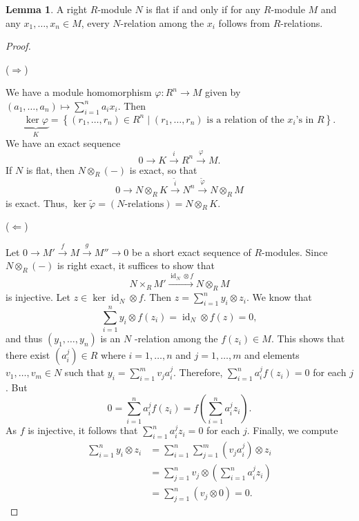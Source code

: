 \documentclass[10pt,letterpaper,cm]{nupset}
\theoremstyle{definition}
\theoremstyle{theorem}
\newtheorem{lemma}[definition]{Lemma}
\theoremstyle{remark}
\newcommand{\1}{\mathbf{1}}
\newcommand{\0}{\vec 0}
\DeclareMathOperator{\id}{id}
\begin{document}
\begin{lemma}
A right $R$-module $N$ is flat if and only if for any $R$-module $M$ and any $x_1, \ldots, x_n \in M$, every $N$-relation among the $x_i$ follows from $R$-relations. 
\end{lemma}
\begin{proof} $ $

($\Longrightarrow$) 

We have a module homomorphism $\varphi : R^n \to M$ given by $(a_1, \ldots, a_n)\mapsto \sum_{i=1}^na_ix_i$. Then $$\underbrace{\ker{\varphi}}_{K}= \left\{(r_1, \ldots, r_n)\in R^n \mid (r_1, \ldots, r_n) \text{ is a relation of the }x_i\text{'s in }R\right\}.$$ We have an exact sequence $$ 0 \to K \overset{i}{\longrightarrow} R^n \overset{\varphi}{\longrightarrow} M  .$$ If $N$ is flat, then $N\otimes_R (-)$ is exact, so that $$ 0 \to N\otimes_R K \overset{\tilde{i}}{\longrightarrow} N^n \overset{\tilde{\varphi}}{\longrightarrow} N\otimes_R M  $$ is exact. Thus, $\ker{\tilde{\varphi}} = (N\text{-relations}) = N\otimes_R K$.

\medskip

($\Longleftarrow$)

 Let $0 \to M' \overset{f}{\longrightarrow}  M  \overset{g}{\longrightarrow} M'' \to 0$ be a short exact sequence of $R$-modules. Since $N \otimes_R (-)$ is right exact, it suffices to show that $$N \times_R M' \overset{\id_N \otimes f}{\longrightarrow} N\otimes_RM$$ is injective. Let $z\in \ker{\id_N \otimes f}$. Then $z= \sum_{i=1}^n y_i \otimes z_i$. We know that $$\sum_{i=1}^n y_i \otimes f(z_i) = \id_N \otimes f(z) =0,$$ and thus $(y_1, \ldots, y_n)$ is an $N$ -relation among the $f(z_i)\in M$. This shows that there exist $(a_i^j) \in R$ where $i=1, \ldots, n$ and $j=1, \ldots, m$ and elements $v_1, \ldots, v_m \in N$ such that $y_i = \sum_{i=1}^m v_ja_i^j$. Therefore, $\sum_{i=1}^n a_i^jf(z_i) = 0$ for each $j$. But $$0 = \sum_{i=1}^n a_i^j f(z_i) = f\left(\sum_{i=1}^n a_i^j z_i \right).$$ As $f$ is injective, it follows that $\sum_{i=1}^n a_i^jz_i = 0$ for each $j$. Finally, we compute 
 \begin{align*}
 \sum_{i=1}^n y_i \otimes z_i & = \sum_{i=1}^n \sum_{j=1}^m (v_ja_i^j) \otimes z_i 
 \\ & = \sum_{j=1}^n v_j \otimes \left(\sum_{i=1}^n a_i^j z_i \right) 
 \\ & = \sum_{j=1}^n (v_j \otimes 0) = 0.
 \end{align*}
\end{proof}
\end{document}
